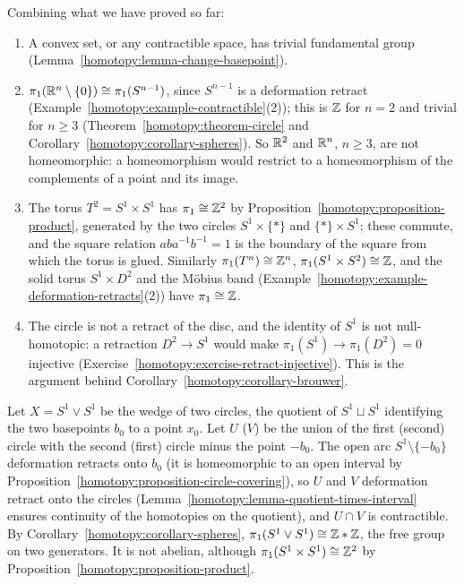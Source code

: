 \begin{example}\label{homotopy:example-pi1-computations}
Combining what we have proved so far:
\begin{enumerate}
\item A convex set, or any contractible space, has trivial fundamental group (Lemma~\ref{homotopy:lemma-change-basepoint}).
\item $\pi_1(\mathbb{R}^n \setminus \{0\}) \cong \pi_1(S^{n-1})$, since $S^{n-1}$ is a deformation retract (Example~\ref{homotopy:example-contractible}(2)); this is $\mathbb{Z}$ for $n = 2$ and trivial for $n \geq 3$
(Theorem~\ref{homotopy:theorem-circle} and Corollary~\ref{homotopy:corollary-spheres}). So $\mathbb{R}^2$ and $\mathbb{R}^n$, $n \geq 3$, are not homeomorphic: a homeomorphism would restrict to a homeomorphism of the complements of a point and its image.
\item The torus $T^2 = S^1 \times S^1$ has $\pi_1 \cong \mathbb{Z}^2$ by Proposition~\ref{homotopy:proposition-product}, generated by the two circles $S^1 \times \{*\}$ and $\{*\} \times S^1$; these commute, and the
square relation $aba^{-1}b^{-1} = 1$ is the boundary of the square from which the torus is glued. Similarly $\pi_1(T^n) \cong \mathbb{Z}^n$, $\pi_1(S^1 \times S^2) \cong \mathbb{Z}$, and the solid torus
$S^1 \times D^2$ and the M\"obius band (Example~\ref{homotopy:example-deformation-retracts}(2)) have $\pi_1 \cong \mathbb{Z}$.
\item The circle is not a retract of the disc, and the identity of $S^1$ is not null-homotopic: a retraction $D^2 \to S^1$ would make $\pi_1(S^1) \to \pi_1(D^2) = 0$ injective
(Exercise~\ref{homotopy:exercise-retract-injective}). This is the argument behind Corollary~\ref{homotopy:corollary-brouwer}.
\end{enumerate}
\end{example}

\begin{example}\label{homotopy:example-wedge}
Let $X = S^1 \vee S^1$ be the wedge of two circles, the quotient of $S^1 \sqcup S^1$ identifying the two basepoints $b_0$ to a point $x_0$. Let $U$ ($V$) be
the union of the first (second) circle with the second (first) circle minus the point $-b_0$. The open arc $S^1 \setminus \{-b_0\}$ deformation retracts onto
$b_0$ (it is homeomorphic to an open interval by Proposition~\ref{homotopy:proposition-circle-covering}), so $U$ and $V$ deformation retract onto the
circles (Lemma~\ref{homotopy:lemma-quotient-times-interval} ensures continuity of the homotopies on the quotient), and $U \cap V$ is contractible. By
Corollary~\ref{homotopy:corollary-spheres}, $\pi_1(S^1 \vee S^1) \cong \mathbb{Z} * \mathbb{Z}$, the free group on two generators. It is not abelian, although
$\pi_1(S^1 \times S^1) \cong \mathbb{Z}^2$ by Proposition~\ref{homotopy:proposition-product}.
\end{example}

